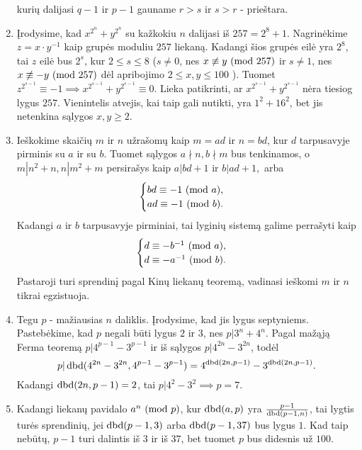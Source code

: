 \begin{enumerate}
    kurių dalijasi $q-1$ ir $p-1$ gauname $r > s$ ir $s > r$ - prieštara.  
\item
    Įrodysime, kad $x^{2^n} + y^{2^n}$ su kažkokiu $n$ dalijasi iš $257 = 2^8
    + 1$. Nagrinėkime $z = x\cdot y^{-1}$ kaip grupės moduliu $257$ liekaną.
    Kadangi šios grupės eilė yra $2^8$, tai $z$ eilė bus $2^s$, kur $2\leq s \leq
    8$ ($s \neq 0$, nes $x \not \equiv y \ (\text{mod } 257)$ ir $s \neq 1$, nes $x \not
    \equiv -y \ (\text{mod } 257)$ dėl apribojimo $2 \leq x,y \leq 100$ ). Tuomet
    $z^{2^{s-1}} \equiv -1 \implies x^{2^{s-1}} + y^{2^{s-1}} \equiv 0$.
    Lieka patikrinti, ar $x^{2^{s-1}} + y^{2^{s-1}}$ nėra tiesiog lygus
    $257$. Vienintelis atvejis, kai taip gali nutikti, yra $1^2 + 16^2$, bet jis
    netenkina sąlygos $x,y \geq 2$. 
\item
    Ieškokime skaičių $m$ ir $n$ užrašomų kaip $m=ad$ ir $n=bd$, kur
    $d$ tarpusavyje pirminis su $a$ ir su $b$. Tuomet sąlygos $a \nmid n,
    b \nmid m$ bus tenkinamos, o  $m|n^2 + n, n|m^2 + m$ persirašys kaip 
    $a|bd+1$ ir $b|ad+1,$ arba 
    $$\begin{cases}
     bd \equiv -1 \ (\text{mod } a), \\
     ad \equiv -1 \ (\text{mod } b).
    \end{cases}$$
    Kadangi $a$ ir $b$ tarpusavyje pirminiai, tai lyginių sistemą galime
    perrašyti kaip
    $$\begin{cases}
     d \equiv -b^{-1} \ (\text{mod } a), \\
     d \equiv -a^{-1} \ (\text{mod } b).
    \end{cases}$$
    Pastaroji turi sprendinį pagal Kinų liekanų teoremą, vadinasi ieškomi
    $m$ ir $n$ tikrai egzistuoja.
\item
     Tegu $p$ - mažiausias $n$ daliklis. Įrodysime, kad jis lygus
     septyniems. Pastebėkime, kad $p$ negali būti lygus $2$ ir $3$, nes $p|3^n
     + 4^n.$ Pagal mažąją Ferma teoremą $p|4^{p-1} - 3^{p-1}$ ir iš
     sąlygos $p|4^{2n} - 3^{2n}$, todėl 
     $$p|\operatorname{dbd}(4^{2n} - 3^{2n}, 4^{p-1} - 3^{p-1}) = 4^{\operatorname{dbd}(2n,p-1)} -
     3^{\operatorname{dbd}(2n,p-1)}.$$ Kadangi $\operatorname{dbd}(2n,p-1) = 2$, tai $p|4^2 - 3^2
     \implies p=7$. 
\item
    Kadangi liekanų pavidalo $a^n \ (\text{mod } p)$, kur $\operatorname{dbd}(a,p)$ yra
    $\frac{p-1}{\operatorname{dbd}(p-1,n)}$, tai lygtis turės sprendinių, jei
    $\operatorname{dbd}(p-1,3)$ arba $\operatorname{dbd}(p-1,37)$ bus lygus $1$. Kad taip
    nebūtų, $p-1$ turi dalintis iš $3$ ir iš $37$, bet tuomet $p$
    bus didesnis už $100$.
\end{enumerate} 
